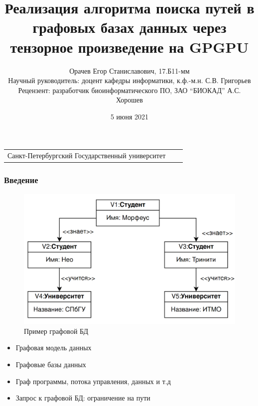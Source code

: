 \documentclass[aspectratio=169,xcolor=table,english]{beamer}
\title[Tensor CFPQ GPGPU]{Реализация алгоритма поиска путей в графовых базах данных через тензорное произведение на GPGPU}
\institute[СПбГУ]{
Программная инженерия
}
\author[Егор Орачев]{Орачев Егор Станиславович, 17.Б11-мм \\Научный руководитель: доцент кафедры информатики, к.ф.-м.н. С.В. Григорьев\\Рецензент: разработчик биоинформатического ПО, ЗАО “БИОКАД” А.С. Хорошев}
\date{5 июня 2021}
\begin{document}
{
\begin{frame}[fragile]
  \begin{table}
  \centering
  \begin{tabularx}{\linewidth}{YcX}
    \begin{minipage}[t]{1.0\textwidth}\center 
    Санкт-Петербургский Государственный университет
      \end{minipage}
  \end{tabularx}
  \end{table}
  \titlepage
\end{frame}
}

\begin{frame}[fragile] \frametitle{Введение}
    \begin{minipage}[m]{0.6\linewidth}
        \begin{figure}
            \centering
            \includegraphics[width=\textwidth]{figures/db_example.png}
            \caption{Пример графовой БД}
            \label{fig:architecture}
        \end{figure}
    \end{minipage}\hfill
    \begin{minipage}[m]{0.4\linewidth}
        \begin{itemize}
            \item Графовая модель данных
            \item Графовые базы данных
            \item Граф программы, потока управления, данных и т.д
            \item Запрос к графовой БД: ограничение на пути
        \end{itemize}
    \end{minipage}
\end{frame}
\end{document}
